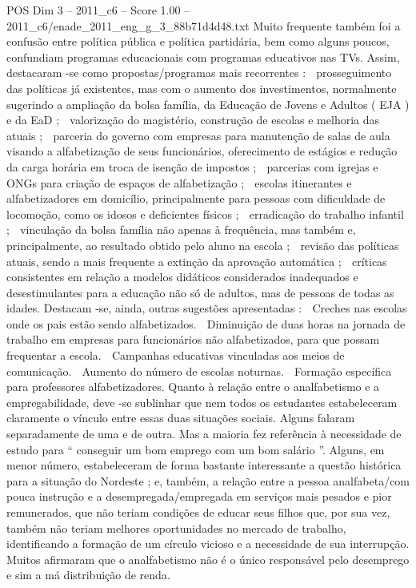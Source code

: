 \begin{textsample}{POS Dim 3 – 2011\_c6 – Score 1.00 – 2011\_c6/enade\_2011\_eng\_g\_3\_88b71d4d48.txt}
Muito frequente também foi a confusão entre política pública e política partidária, bem como alguns poucos, confundiam programas educacionais com programas educativos nas TVs.
Assim, destacaram -se como propostas/programas mais recorrentes :  prosseguimento das políticas já existentes, mas com o aumento dos investimentos, normalmente sugerindo a ampliação da bolsa família, da Educação de Jovens e Adultos ( EJA ) e da EaD ;  valorização do magistério, construção de escolas e melhoria das atuais ;  parceria do governo com empresas para manutenção de salas de aula visando a alfabetização de seus funcionários, oferecimento de estágios e redução da carga horária em troca de isenção de impostos ;  parcerias com igrejas e ONGs para criação de espaços de alfabetização ;  escolas itinerantes e alfabetizadores em domicílio, principalmente para pessoas com dificuldade de locomoção, como os idosos e deficientes físicos ;  erradicação do trabalho infantil ;  vinculação da bolsa família não apenas à frequência, mas também e, principalmente, ao resultado obtido pelo aluno na escola ;  revisão das políticas atuais, sendo a mais frequente a extinção da aprovação automática ;  críticas consistentes em relação a modelos didáticos considerados inadequados e desestimulantes para a educação não só de adultos, mas de pessoas de todas as idades.
Destacam -se, ainda, outras sugestões apresentadas :  Creches nas escolas onde os pais estão sendo alfabetizados.  Diminuição de duas horas na jornada de trabalho em empresas para funcionários não alfabetizados, para que possam frequentar a escola.  Campanhas educativas vinculadas aos meios de comunicação.  Aumento do número de escolas noturnas.  Formação específica para professores alfabetizadores.
Quanto à relação entre o analfabetismo e a empregabilidade, deve -se sublinhar que nem todos os estudantes estabeleceram claramente o vínculo entre essas duas situações sociais.
Alguns falaram separadamente de uma e de outra.
Mas a maioria fez referência à necessidade de estudo para “ conseguir um bom emprego com um bom salário ”.
Alguns, em menor número, estabeleceram de forma bastante interessante a questão histórica para a situação do Nordeste ; e, também, a relação entre a pessoa analfabeta/com pouca instrução e a desempregada/empregada em serviços mais pesados e pior remunerados, que não teriam condições de educar seus filhos que, por sua vez, também não teriam melhores oportunidades no mercado de trabalho, identificando a formação de um círculo vicioso e a necessidade de sua interrupção.
Muitos afirmaram que o analfabetismo não é o único responsável pelo desemprego e sim a má distribuição de renda.

\end{textsample}
